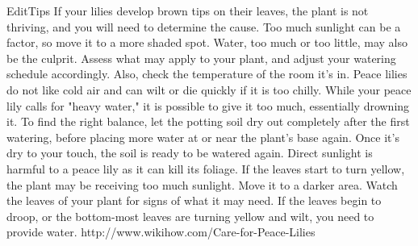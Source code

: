 \documentclass{book}
\begin{document}
EditTips
If your lilies develop brown tips on their leaves, the plant is not thriving, and you will need to determine the cause. Too much sunlight can be a factor, so move it to a more shaded spot. Water, too much or too little, may also be the culprit. Assess what may apply to your plant, and adjust your watering schedule accordingly. Also, check the temperature of the room it's in. Peace lilies do not like cold air and can wilt or die quickly if it is too chilly.
While your peace lily calls for "heavy water," it is possible to give it too much, essentially drowning it. To find the right balance, let the potting soil dry out completely after the first watering, before placing more water at or near the plant's base again. Once it's dry to your touch, the soil is ready to be watered again.
Direct sunlight is harmful to a peace lily as it can kill its foliage. If the leaves start to turn yellow, the plant may be receiving too much sunlight. Move it to a darker area.
Watch the leaves of your plant for signs of what it may need. If the leaves begin to droop, or the bottom-most leaves are turning yellow and wilt, you need to provide water.
http://www.wikihow.com/Care-for-Peace-Lilies
\end{document}
